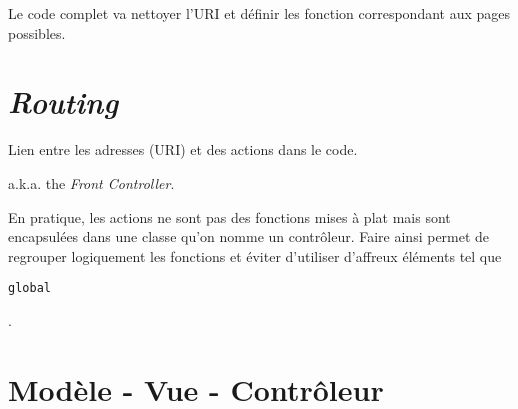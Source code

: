 \begin{otherlanguage}{english}

\begin{Shaded}
\begin{Highlighting}[]


\NormalTok{ = }\OtherTok{[}\OtherTok{],}
\NormalTok{ = }\OtherTok{[];}

\OtherTok{(}
    \OtherTok{,}
    \OtherTok{,}
\OtherTok{)}  \OtherTok{(}\OtherTok{);}

 \OtherTok{(}
    \OtherTok{[}\OtherTok{],}
    \OtherTok{[}\OtherTok{[}\OtherTok{]]}
\OtherTok{);}
\end{Highlighting}
\end{Shaded}

\end{otherlanguage}

Le code complet va nettoyer l'URI et définir les fonction correspondant
aux pages possibles.

\hypertarget{routing}{%
\section{\texorpdfstring{\emph{Routing}}{Routing}}\label{routing}}

Lien entre les adresses (URI) et des actions dans le code.

a.k.a. the \emph{Front Controller}.

En pratique, les actions ne sont pas des fonctions mises à plat mais
sont encapsulées dans une classe qu'on nomme un contrôleur. Faire ainsi
permet de regrouper logiquement les fonctions et éviter d'utiliser
d'affreux éléments tel que
\begin{otherlanguage}{english}\texttt{global}\end{otherlanguage}.

\hypertarget{moduxe8le---vue---contruxf4leur}{%
\section{Modèle - Vue -
Contrôleur}\label{moduxe8le---vue---contruxf4leur}}

